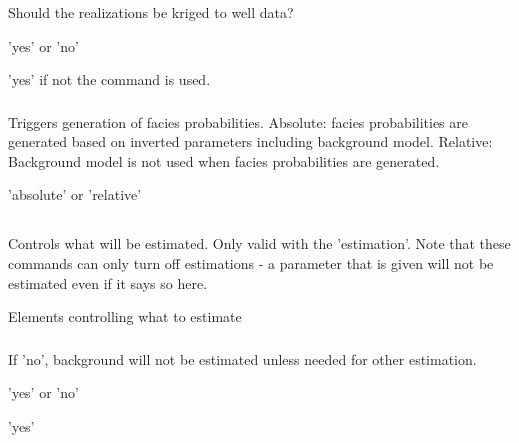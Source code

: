 \subsubsection{}  
 \slist
   \item \Description Should the realizations be kriged to well data?
   \item \Argument 'yes' or 'no'
   \item \Default 'yes' if not the  command is used.
 \elist

\subsubsection{}  
 \slist
   \item \Description Triggers generation of facies probabilities. Absolute: facies probabilities are generated based on inverted parameters including background model. Relative: Background model is not used when facies probabilities are generated.
   \item \Argument 'absolute' or 'relative'
   \item \Default
 \elist




\subsection{} 
 \slist
   \item \Description Controls what will be estimated. Only valid with the  'estimation'. Note that these commands can only turn off estimations - a parameter that is given will not be estimated even if it says so here.
   \item \Argument Elements controlling what to estimate
   \item \Default
 \elist

\subsubsection{}  
 \slist
   \item \Description If 'no', background will not be estimated unless needed for other estimation.
   \item \Argument 'yes' or 'no'
   \item \Default 'yes'
 \elist

